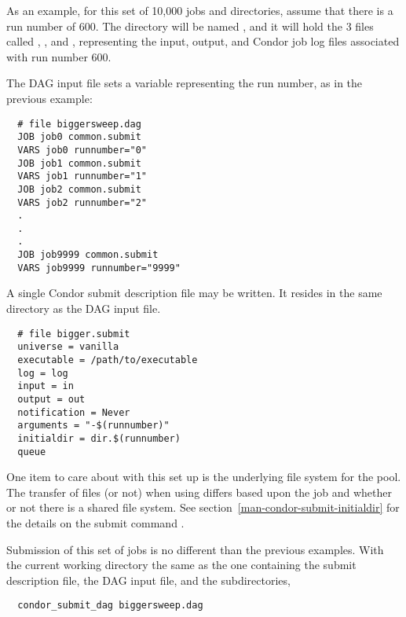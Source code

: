 As an example, for this set of 10,000 jobs and directories, assume
that there is a run number of 600.
The directory will be named , and it will
hold the 3 files called , , and ,
representing the input, output, and Condor job log files associated
with run number 600.

The DAG input file sets a variable representing the run number,
as in the previous example:
\begin{verbatim}
  # file biggersweep.dag
  JOB job0 common.submit
  VARS job0 runnumber="0"
  JOB job1 common.submit
  VARS job1 runnumber="1"
  JOB job2 common.submit
  VARS job2 runnumber="2"
  .
  .
  .
  JOB job9999 common.submit
  VARS job9999 runnumber="9999"
\end{verbatim}

A single Condor submit description file may be written.
It resides in the same directory as the DAG input file.
\begin{verbatim}
  # file bigger.submit
  universe = vanilla
  executable = /path/to/executable
  log = log
  input = in
  output = out
  notification = Never
  arguments = "-$(runnumber)"
  initialdir = dir.$(runnumber)
  queue
\end{verbatim}

One item to care about with this set up is the underlying file system 
for the pool.
The transfer of files (or not) when using 
differs based upon the job  and whether or not there
is a shared file system.
See section~\ref{man-condor-submit-initialdir} for the details on the
submit command .

Submission of this set of jobs is no different than the previous
examples.  
With the current working directory the same as the one containing
the submit description file, the DAG input file, and the subdirectories,
\begin{verbatim}
  condor_submit_dag biggersweep.dag
\end{verbatim}

